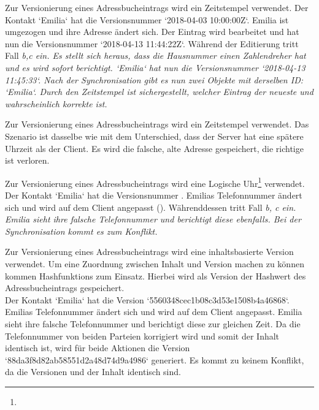 \begin{description}[leftmargin=0.5cm,style=nextline]
  Zur Versionierung eines Adressbucheintrags wird ein Zeitstempel verwendet. Der Kontakt `Emilia` hat die Versionsnummer `2018-04-03 10:00:00Z`. Emilia ist umgezogen und ihre Adresse ändert sich. Der Eintrag wird bearbeitet und hat nun die Versionsnummer `2018-04-13 11:44:22Z`. Während der Editierung tritt Fall \it{b,c} ein. Es stellt sich heraus, dass die Hausnummer einen Zahlendreher hat und es wird sofort berichtigt. `Emilia` hat nun die Versionsnummer `2018-04-13 11:45:33`. Nach der Synchronisation gibt es nun zwei Objekte mit derselben ID: `Emilia`. Durch den Zeitstempel ist sichergestellt, welcher Eintrag der neueste und wahrscheinlich korrekte ist.\\
  \item[Szenario V2:]%
  Zur Versionierung eines Adressbucheintrags wird ein Zeitstempel verwendet. Das Szenario ist dasselbe wie  mit dem Unterschied, dass der Server hat eine spätere Uhrzeit als der Client. Es wird die falsche, alte Adresse gespeichert, die richtige ist verloren.\\
  \item[Szenario V3:]%
  Zur Versionierung eines Adressbucheintrags wird eine Logische Uhr\footnote{\logicalclock} verwendet. Der Kontakt `Emilia` hat die Versionsnummer . Emilias Telefonnummer ändert sich und wird auf dem Client angepasst (). Währenddessen tritt Fall \it{b, c} ein. Emilia sieht ihre falsche Telefonnummer und berichtigt diese ebenfalls. Bei der Synchronisation kommt es zum Konflikt. \\
  \item[Szenario V4:]%
  Zur Versionierung eines Adressbucheintrags wird eine inhaltsbasierte Version verwendet. Um eine Zuordnung zwischen Inhalt und Version machen zu können kommen \Glspl{Hashfunktion} zum Einsatz. Hierbei wird als Version der Hashwert des Adressbucheintrags gespeichert.\\
  Der Kontakt `Emilia` hat die Version `5560348cec1b08c3d53e1508b4a46868`. Emilias Telefonnummer ändert sich und wird auf dem Client angepasst. Emilia sieht ihre falsche Telefonnummer und berichtigt diese zur gleichen Zeit. Da die Telefonnummer von beiden Parteien korrigiert wird und somit der Inhalt identisch ist, wird für beide Aktionen die Version `88da3f8d82ab58551d2a48d74d9a4986` generiert. Es kommt zu keinem Konflikt, da die Versionen und der Inhalt identisch sind.\\

\end{description}
